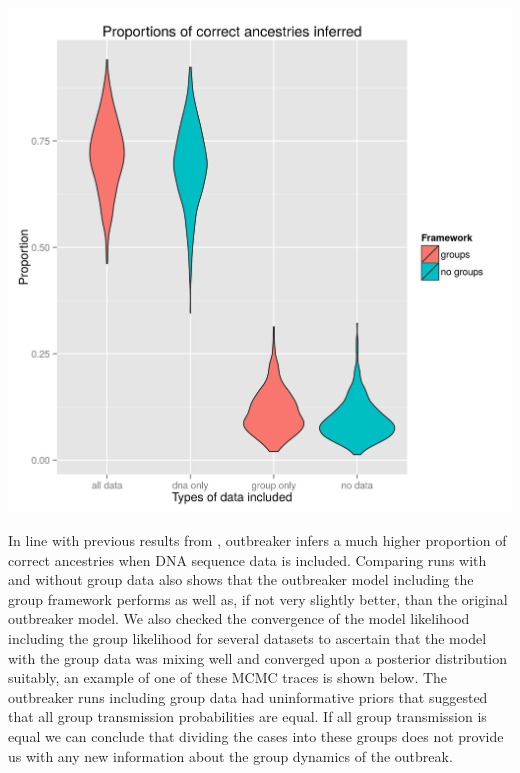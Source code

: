 \documentclass[11pt,a4paper]{report}
\begin{document}
\begin{center}
\includegraphics[scale=0.6]{violin_colours.png}
\end{center}
In line with previous results from \citet{outbrkr}, outbreaker infers a much higher proportion of correct ancestries when DNA sequence data is included. Comparing runs with and without group data also shows that the outbreaker model including the group framework performs as well as, if not very slightly better, than the original outbreaker model. We also checked the convergence of the model likelihood including the group likelihood for several datasets to ascertain that the model with the group data was mixing well and converged upon a posterior distribution suitably, an example of one of these MCMC traces is shown below. The outbreaker runs including group data had uninformative priors that suggested that all group transmission probabilities are equal. If all group transmission is equal we can conclude that dividing the cases into these groups does not provide us with any new information about the group dynamics of the outbreak. 
\end{document}
